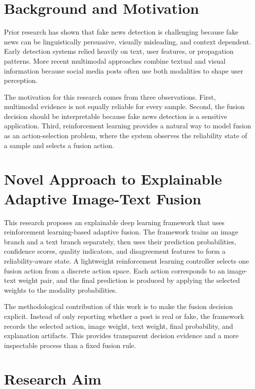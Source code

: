 \section{Background and Motivation}


Prior research has shown that fake news detection is challenging because fake news can be linguistically persuasive, visually misleading, and context dependent. Early detection systems relied heavily on text, user features, or propagation patterns. More recent multimodal approaches combine textual and visual information because social media posts often use both modalities to shape user perception.


The motivation for this research comes from three observations. First, multimodal evidence is not equally reliable for every sample. Second, the fusion decision should be interpretable because fake news detection is a sensitive application. Third, reinforcement learning provides a natural way to model fusion as an action-selection problem, where the system observes the reliability state of a sample and selects a fusion action.


\section{Novel Approach to Explainable Adaptive Image-Text Fusion}


This research proposes an explainable deep learning framework that uses reinforcement learning-based adaptive fusion. The framework trains an image branch and a text branch separately, then uses their prediction probabilities, confidence scores, quality indicators, and disagreement features to form a reliability-aware state. A lightweight reinforcement learning controller selects one fusion action from a discrete action space. Each action corresponds to an image-text weight pair, and the final prediction is produced by applying the selected weights to the modality probabilities.


The methodological contribution of this work is to make the fusion decision explicit. Instead of only reporting whether a post is real or fake, the framework records the selected action, image weight, text weight, final probability, and explanation artifacts. This provides transparent decision evidence and a more inspectable process than a fixed fusion rule.


\section{Research Aim}


